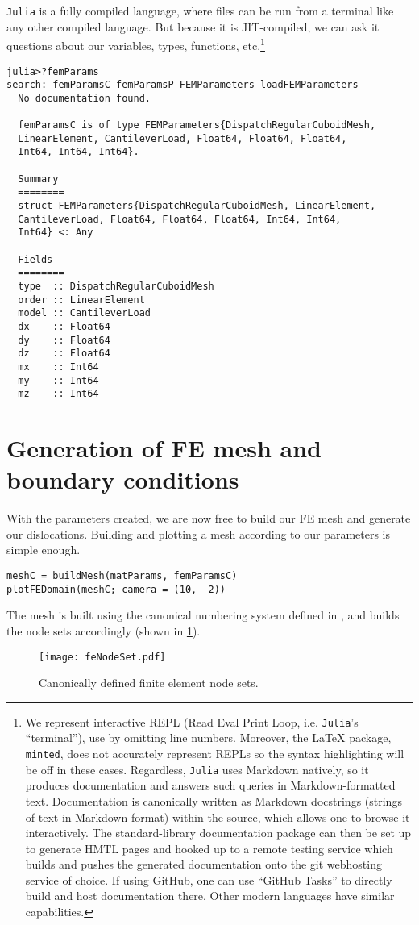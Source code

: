 \texttt{Julia} is a fully compiled language, where files can be run from a terminal like any other compiled language. But because it is JIT-compiled, we can ask it questions about our variables, types, functions, etc.\footnote{We represent interactive REPL (Read Eval Print Loop, i.e. \texttt{Julia}'s ``terminal''), use by omitting line numbers. Moreover, the \LaTeX{} package, \texttt{minted}, does not accurately represent REPLs so the syntax highlighting will be off in these cases. Regardless, \texttt{Julia} uses Markdown natively, so it produces documentation and answers such queries in Markdown-formatted text. Documentation is canonically written as Markdown docstrings (strings of text in Markdown format) within the source, which allows one to browse it interactively. The standard-library documentation package can then be set up to generate HMTL pages and hooked up to a remote testing service which builds and pushes the generated documentation onto the git webhosting service of choice. If using GitHub, one can use ``GitHub Tasks'' to directly build and host documentation there. Other modern languages have similar capabilities.}
\begin{verbatim}
julia>?femParams
search: femParamsC femParamsP FEMParameters loadFEMParameters
  No documentation found.

  femParamsC is of type FEMParameters{DispatchRegularCuboidMesh, 
  LinearElement, CantileverLoad, Float64, Float64, Float64, 
  Int64, Int64, Int64}.

  Summary  
  ========
  struct FEMParameters{DispatchRegularCuboidMesh, LinearElement, 
  CantileverLoad, Float64, Float64, Float64, Int64, Int64, 
  Int64} <: Any

  Fields
  ========
  type  :: DispatchRegularCuboidMesh
  order :: LinearElement
  model :: CantileverLoad
  dx    :: Float64
  dy    :: Float64
  dz    :: Float64
  mx    :: Int64
  my    :: Int64
  mz    :: Int64
\end{verbatim}

\section{Generation of FE mesh and boundary conditions}

With the parameters created, we are now free to build our FE mesh and generate our dislocations. Building and plotting a mesh according to our parameters is simple enough.
\begin{verbatim}
meshC = buildMesh(matParams, femParamsC)
plotFEDomain(meshC; camera = (10, -2))
\end{verbatim}
The mesh is built using the canonical numbering system defined in \cite{femcanonical}, and builds the node sets accordingly (shown in \cref{f:feNodeSet}).
\begin{figure}
    \centering
    \texttt{[image: feNodeSet.pdf]}
    \caption[Canonically defined finite element node sets.]{Canonically defined finite element node sets.}
    \label{f:feNodeSet}
\end{figure}

